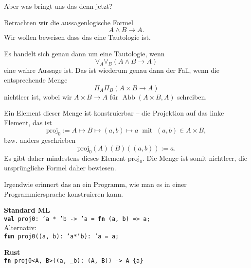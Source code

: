 \documentclass[9pt]{beamer}
\newcommand{\Abb}{\operatorname{Abb}}
\newcommand{\strong}[1]{\textsf{\textbf{#1}}}
\newcommand{\kw}[1]{\textbf{#1}}
\begin{document}
\begin{frame}
Aber was bringt uns das denn jetzt?\pause

\vspace{1em}
Betrachten wir die aussagenlogische Formel
\[A\land B\to A.\]
Wir wollen beweisen dass das eine Tautologie ist.\pause

\vspace{1em}
Es handelt sich genau dann um eine Tautologie, wenn
\[\forall_A\forall_B (A\land B\to A)\]
eine wahre Aussage ist.\pause{} Das ist wiederum genau dann der
Fall, wenn die entsprechende Menge
\[\Pi_A\Pi_B (A\times B\to A)\]
nichtleer ist, wobei wir $A\times B\to A$ für $\Abb(A\times B,A)$ schreiben.
\end{frame}

\begin{frame}
Ein Element dieser Menge ist konstruierbar -- die Projektion
auf das linke Element, das ist
\[\mathrm{proj_0} := A\mapsto B\mapsto (a,b)\mapsto a\;\;\text{mit}\;\;
(a,b)\in A\times B,\]
bzw. anders geschrieben
\[\mathrm{proj_0}(A)(B)((a,b)) := a.\]\pause
Es gibt daher mindestens dieses Element $\mathrm{proj}_0$. Die Menge
ist somit nichtleer, die ursprüngliche Formel daher bewiesen.
\end{frame}

\begin{frame}
Irgendwie erinnert das an ein Programm, wie man es in einer
Programmiersprache konstruieren kann.\pause

\vspace{1em}
\strong{Standard ML}\\[4pt]
\texttt{\kw{val} proj0: 'a * 'b -> 'a = \kw{fn} (a, b) => a;}\\[8pt]

Alternativ:\\[4pt]

\texttt{\kw{fun} proj0((a, b): 'a*'b): 'a = a;}\pause

\vspace{1.4em}
\strong{Rust}\\[4pt]
\texttt{\kw{fn} proj0<A, B>((a, \_b): (A, B)) -> A \{a\}}
\end{frame}
\end{document}
